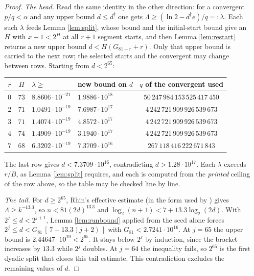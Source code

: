 \documentclass[11pt,a4paper]{article}
\theoremstyle{plain}\newtheorem{theorem}{Theorem}\newtheorem{proposition}[theorem]{Proposition}
\theoremstyle{definition}\newtheorem{example}[theorem]{Example}
\theoremstyle{remark}\newtheorem{remark}[theorem]{Remark}
\begin{document}
\begin{proof}
\emph{The head.} Read the same identity in the other direction: for a convergent $p/q<\alpha$
and any upper bound $d\le d^{\dagger}$ one gets $\Lambda\ge(\ln2-d^{\dagger}e)/q=:\lambda$. Each
such $\lambda$ feeds Lemma \ref{lem:split}, whose bound and the initial-start bound give an
$H$ with $x+1<2^H$ at all $r+1$ segment starts, and then Lemma \ref{lem:restart} returns a new
upper bound $d<H(G_{81-r}+r)$. Only that upper bound is carried to the next row; the selected
starts and the convergent may change between rows. Starting from $d<2^{65}$:
\begin{center}
\begin{tabular}{ccllc}
\hline
$r$ & $H$ & $\lambda\ge$ & new bound on $d$ & $q$ of the convergent used\\
\hline
$0$ & $73$ & $8.8606\cdot10^{-21}$ & $1.9886\cdot10^{18}$ & $50\,247\,984\,153\,525\,417\,450$\\
$2$ & $71$ & $1.0491\cdot10^{-19}$ & $7.6987\cdot10^{17}$ & $4\,242\,721\,909\,926\,539\,673$\\
$3$ & $71$ & $1.4074\cdot10^{-19}$ & $4.8572\cdot10^{17}$ & $4\,242\,721\,909\,926\,539\,673$\\
$4$ & $74$ & $1.4909\cdot10^{-19}$ & $3.1940\cdot10^{17}$ & $4\,242\,721\,909\,926\,539\,673$\\
$7$ & $68$ & $6.3202\cdot10^{-19}$ & $7.3709\cdot10^{16}$ & $267\,118\,416\,222\,671\,843$\\
\hline
\end{tabular}
\end{center}
The last row gives $d<7.3709\cdot10^{16}$, contradicting $d>1.28\cdot10^{17}$. Each
$\lambda$ exceeds $r/B$, as Lemma \ref{lem:split} requires, and each is computed from the
\emph{printed} ceiling of the row above, so the table may be checked line by line.

\emph{The tail.} For $d\ge2^{65}$, Rhin's effective estimate \cite{rhin1987} (in the form used by
\cite[Prop.~6.3]{rozier2026}) gives $\Lambda\ge k^{-13.3}$, so $n<81(2d)^{13.3}$ and
$\log_2(n+1)<7+13.3\log_2(2d)$. With $2^j\le d<2^{j+1}$, Lemma \ref{lem:runbound} applied from
the seed alone forces
$2^j\le d<G_{81}\,[\,7+13.3(j+2)\,]$ with $G_{81}<2.7241\cdot10^{16}$.
At $j=65$ the upper bound is $2.44647\cdot10^{19}<2^{65}$. It stays below $2^j$ by induction,
since the bracket increases by $13.3$ while $2^j$ doubles. At $j=64$ the inequality fails, so
$2^{65}$ is the first dyadic split that closes this tail estimate. This contradiction excludes the remaining
values of $d$.
\end{proof}
\end{document}
